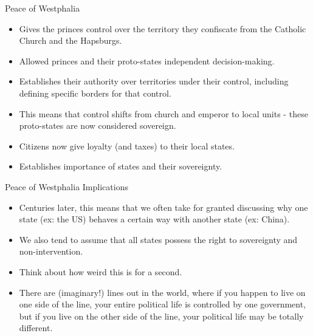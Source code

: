 \documentclass{beamer}
\begin{document}
\begin{frame}{\LARGE Peace of Westphalia}
\begin{itemize}
    \item Gives the princes control over the territory they confiscate from the Catholic Church and the Hapsburgs. \pause
    \item Allowed princes and their proto-states independent decision-making. \pause
    \item Establishes their authority over territories under their control, including defining specific borders for that control. \pause
    \item This means that control shifts from church and emperor to local units - these proto-states are now considered sovereign. \pause
    \item Citizens now give loyalty (and taxes) to their local states.
    \item Establishes importance of states and their sovereignty.
\end{itemize}
\end{frame}

\begin{frame}{\LARGE Peace of Westphalia Implications}
	\begin{itemize}
		\item Centuries later, this means that we often take for granted discussing why one state (ex: the US) behaves a certain way with another state (ex: China).
		\item We also tend to assume that all states possess the right to sovereignty and non-intervention.
		\item Think about how weird this is for a second. \pause
		\item There are (imaginary!) lines out in the world, where if you happen to live on one side of the line, your entire political life is controlled by one government, but if you live on the other side of the line, your political life may be totally different.
	\end{itemize}
\end{frame}
\end{document}
